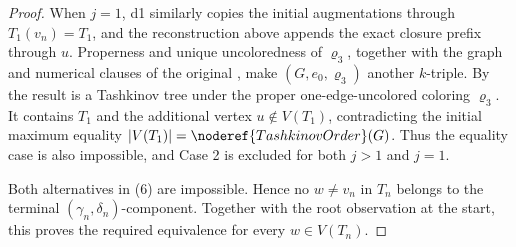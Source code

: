 \begin{proof}
When \(j=1\), d1 similarly copies the initial augmentations through
\(T_1(v_n)=T_1\), and the reconstruction above appends the exact closure
prefix through \(u\).  Properness and unique uncoloredness of
\(\varrho_3\), together with the graph and numerical clauses of the
original , make \((G,e_0,\varrho_3)\) another
\(k\)-triple.  By
 the result is
a Tashkinov tree under the proper one-edge-uncolored coloring
\(\varrho_3\).  It contains \(T_1\) and the additional vertex
\(u\notin V(T_1)\), contradicting the initial maximum equality
\(|V(T_1)|=\noderef{TashkinovOrder}(G)\).  Thus the equality case is also
impossible, and Case 2 is excluded for both \(j>1\) and \(j=1\).

Both alternatives in (6) are impossible.  Hence no
\(w\ne v_n\) in \(T_n\) belongs to the terminal
\((\gamma_n,\delta_n)\)-component.  Together with the root observation
at the start, this proves the required equivalence for every
\(w\in V(T_n)\).
\end{proof}
